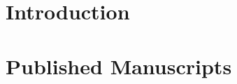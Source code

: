 \dedication{}

\begin{abstract}

\end{abstract}

\mainmatter

\chapter{Introduction}\label{introduction}


\chapter{Published Manuscripts}\label{published-manuscripts}\clearpage

